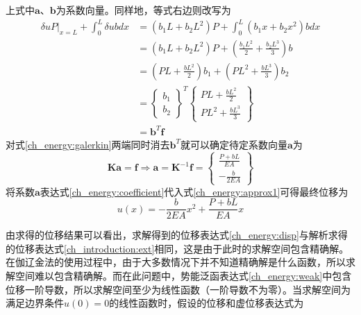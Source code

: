 上式中$\boldsymbol a$、$\boldsymbol b$为系数向量。同样地，等式右边则改写为
\begin{equation}
\begin{split}
    \delta u P \vert_{x=L} + \int_0^L \delta u b dx &= (b_1 L + b_2 L^2)P + \int_0^L (b_1 x + b_2 x^2) b dx \\
                                                    &= (b_1 L + b_2 L^2)P + (\frac{b_1 L^2}{2} + \frac{b_2 L^3}{3}) b \\
                                                    &= (PL+\frac{b L^2}{2})b_1  + (PL^2 + \frac{b L^3}{3})b_2 \\
                                                    &= \begin{Bmatrix}
                                                   b_1 \\ b_2 
                                                    \end{Bmatrix}^T \begin{Bmatrix}
                                                   PL + \frac{bL^2}{2} \\ PL^2 + \frac{bL^3}{3}
                                                    \end{Bmatrix} \\
                                                    &= \boldsymbol b^T \boldsymbol f
\end{split}
\end{equation}
对式\eqref{ch_energy:galerkin}两端同时消去$\boldsymbol b^T$就可以确定待定系数向量$\boldsymbol a$为
\begin{equation}\label{ch_energy:coefficient}
    \boldsymbol{Ka} = \boldsymbol f \Rightarrow \boldsymbol a = \boldsymbol K^{-1}\boldsymbol f = \begin{Bmatrix}
    \frac{P+bL}{EA} \\ - \frac{b}{2EA}
    \end{Bmatrix}
\end{equation}
将系数$\boldsymbol a$表达式\eqref{ch_energy:coefficient}代入式\eqref{ch_energy:approx1}可得最终位移为
\begin{equation}\label{ch_energy:disp}
u(x) = -\frac{b}{2EA}x^2 + \frac{P+bL}{EA}x
\end{equation}\par
由求得的位移结果可以看出，求解得到的位移表达式\eqref{ch_energy:disp}与解析求得的位移表达式\eqref{ch_introduction:ext}相同，这是由于此时的求解空间包含精确解。在伽辽金法的使用过程中，由于大多数情况下并不知道精确解是什么函数，所以求解空间难以包含精确解。而在此问题中，势能泛函表达式\eqref{ch_energy:weak}中包含位移一阶导数，所以求解空间至少为线性函数（一阶导数不为零）。当求解空间为满足边界条件$u(0)=0$的线性函数时，假设的位移和虚位移表达式为
